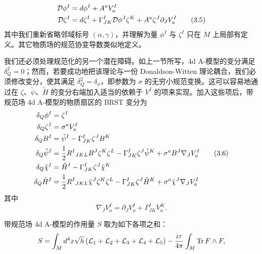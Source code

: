 \begin{align}
  \mathcal{D}\phi^I &= d\phi^I+A^aV^I_a \notag\\
  \mathcal{D}\zeta^I &= d\zeta^I+\Gamma^I_{JK}\mathcal{D}\phi^J\zeta^K+A^a\zeta^J\partial_JV^I_a \tag{3.5}
\end{align}
其中我们重新省略邻域标号 $(\alpha,\gamma)$，并理解为量 $\phi^I$ 与 $\zeta^I$ 只在 $M$ 上局部有定义。其它物质场的规范协变导数类似地定义。

我们还必须处理规范化的另一个潜在障碍。如上一节所写，4d A-模型的变分满足 $\delta_Q^2=0$；然而，若要成功地把该理论与一份 Donaldson-Witten 理论耦合，我们必须修改变分，使其满足 $\delta_Q^2=\delta_\sigma$，即参数为 $\sigma$ 的无穷小规范变换。这可以容易地通过在 $\zeta$、$\tilde\psi$、$\tilde H$ 的变分右端加入适当的依赖于 $V^I$ 的项来实现。加入这些项后，带规范场 4d A-模型的物质扇区的 BRST 变分为
\begin{align}
  \delta_Q\phi^I &= \zeta^I \notag\\
  \delta_Q\zeta^I &= \sigma^aV^I_a \notag\\
  \delta_QB^I &= \tilde\psi^I-\Gamma^I_{JK}\zeta^JB^K \notag\\
  \delta_Q\tilde\psi^I &= \frac12R^I{}_{JKL}B^J\zeta^K\zeta^L-\Gamma^I_{JK}\zeta^J\tilde\psi^K+\sigma^aB^J\nabla_JV^I_a \tag{3.6}\\
  \delta_Q\tilde\chi^I &= \tilde H^I-\Gamma^I_{JK}\zeta^J\tilde\chi^K \notag\\
  \delta_Q\tilde H^I &= \frac12R^I{}_{JKL}\tilde\chi^J\zeta^K\zeta^L-\Gamma^I_{JK}\zeta^J\tilde H^K+\sigma^a\tilde\chi^J\nabla_JV^I_a \notag
\end{align}
其中
\[
  \nabla_JV^I_a=\partial_JV^I_a+\Gamma^I_{JK}V^K_a.
\]

带规范场 4d A-模型的作用量 $S$ 取为如下各项之和：
\[
  S=\int_Md^4x\sqrt{h}\left(\mathcal{L}_1+\mathcal{L}_2+\mathcal{L}_3+\mathcal{L}_4+\mathcal{L}_5\right)-\frac{i\tau}{4\pi}\int_M\operatorname{Tr} F\wedge F,
\]


